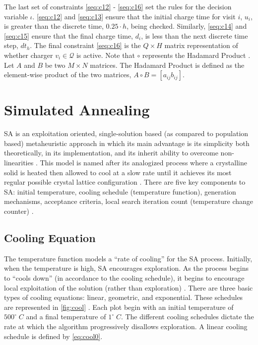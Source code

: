 \documentclass[11pt,a4paper,final]{article}
\newcommand{\Qset}{\mathcal{Q}}             %
\begin{document}
The last set of constraints \ref{seq:c12} - \ref{seq:c16} set the rules for the decision variable \(\iota\). \ref{seq:c12} and
\ref{seq:c13} ensure that the initial charge time for visit \(i\), \(u_i\), is greater than the discrete time, \(0.25 \cdot h\),
being checked. Similarly, \ref{seq:c14} and \ref{seq:c15} ensure that the final charge time, \(d_i\), is less than the
next discrete time step, \(dt_h\). The final constraint \ref{seq:c16} is the \(Q \times H\) matrix representation of whether
charger \(v_i \in \Qset\) is active. Note that \(\circ\) represents the Hadamard Product \cite{horn-1985-matrix-analy}. Let \(A\)
and \(B\) be two \(M \times N\) matrices. The Hadamard Product is defined as the element-wise product of the two matrices, \(A \circ B
= [a_{ij}b_{ij}]\).
\section{Simulated Annealing}
\label{sec:simulated-annealing}
SA is an exploitation oriented, single-solution based (as compared to population based) metaheuristic approach in which
its main advantage is its simplicity both theoretically, in its implementation, and its inherit ability to overcome
non-linearities \cite{gendreau-2018-handb-metah,radosavljevic-2018-metah-optim}. This model is named after its
analogized process where a crystalline solid is heated then allowed to cool at a slow rate until it achieves its most
regular possible crystal lattice configuration \cite{henderson-1989-theor-pract}. There are five key components to SA:
initial temperature, cooling schedule (temperature function), generation mechanisms, acceptance criteria, local search
iteration count (temperature change counter) \cite{keller-2019-multi-objec}.

\subsection{Cooling Equation}
\label{cooling-equation-experimental}
The temperature function models a ``rate of cooling'' for the SA process. Initially, when the temperature is high, SA
encourages exploration. As the process begins to ``cools down'' (in accordance to the cooling schedule), it begins to
encourage local exploitation of the solution (rather than exploration)
\cite{rutenbar-1989-simul-anneal-algor,henderson-1989-theor-pract}. There are three basic types of cooling equations:
linear, geometric, and exponential. These schedules are represented in \ref{fig:cool} \cite{keller-2019-multi-objec}. Each
plot begin with an initial temperature of \(500^\circ\; C\) and a final temperature of \(1^\circ\; C\). The different
cooling schedules dictate the rate at which the algorithm progressively disallows exploration. A linear cooling schedule
is defined by \ref{eq:cool0}.
\end{document}
